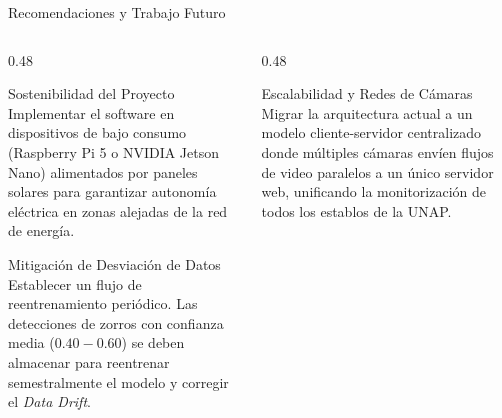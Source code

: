 \documentclass[10pt,aspectratio=169]{beamer}
\begin{document}
\begin{frame}{Recomendaciones y Trabajo Futuro}
  \begin{columns}[T]
    \begin{column}{0.48\textwidth}
      \begin{block}{Sostenibilidad del Proyecto}
        \small
        Implementar el software en dispositivos de bajo consumo (Raspberry Pi 5 o NVIDIA Jetson Nano) alimentados por paneles solares para garantizar autonomía eléctrica en zonas alejadas de la red de energía.
      \end{block}
      \begin{block}{Mitigación de Desviación de Datos}
        \small
        Establecer un flujo de reentrenamiento periódico. Las detecciones de zorros con confianza media ($0.40 - 0.60$) se deben almacenar para reentrenar semestralmente el modelo y corregir el \textit{Data Drift}.
      \end{block}
    \end{column}
    
    \begin{column}{0.48\textwidth}
      \begin{block}{Escalabilidad y Redes de Cámaras}
        \small
        Migrar la arquitectura actual a un modelo cliente-servidor centralizado donde múltiples cámaras envíen flujos de video paralelos a un único servidor web, unificando la monitorización de todos los establos de la UNAP.
      \end{block}
    \end{column}
  \end{columns}
\end{frame}
\end{document}

